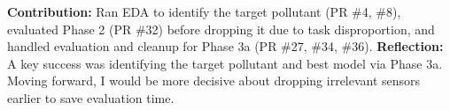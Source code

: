 \textbf{Contribution:} Ran EDA to identify the target pollutant (PR \#4, \#8), evaluated Phase 2 (PR \#32) before dropping it due to task disproportion, and handled evaluation and cleanup for Phase 3a (PR \#27, \#34, \#36).\newline
\noindent\textbf{Reflection:} A key success was identifying the target pollutant and best model via Phase 3a. Moving forward, I would be more decisive about dropping irrelevant sensors earlier to save evaluation time.